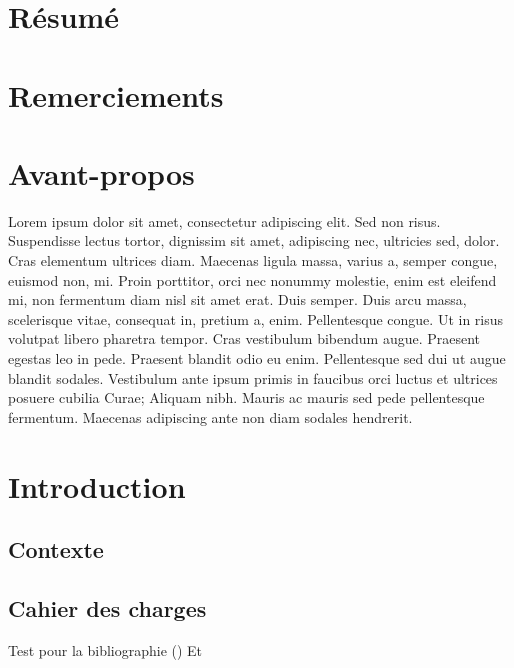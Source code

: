\documentclass[twoside]{report}
\newcommand{\clearemptydoublepage}{\newpage{\pagestyle{empty}
\cleardoublepage}}
\begin{document}
\clearemptydoublepage
\pagestyle{preliminary}
\chapter*{Résumé}
\thispagestyle{empty}
\cleardoublepage
\chapter*{Remerciements}
\thispagestyle{empty}
\cleardoublepage
\chapter*{Avant-propos}
\thispagestyle{empty}
Lorem ipsum dolor sit amet, consectetur adipiscing elit. Sed non risus. Suspendisse lectus tortor, dignissim sit amet, adipiscing nec, ultricies sed, dolor. Cras elementum ultrices diam. Maecenas ligula massa, varius a, semper congue, euismod non, mi. Proin porttitor, orci nec nonummy molestie, enim est eleifend mi, non fermentum diam nisl sit amet erat. Duis semper. Duis arcu massa, scelerisque vitae, consequat in, pretium a, enim. Pellentesque congue. Ut in risus volutpat libero pharetra tempor. Cras vestibulum bibendum augue. Praesent egestas leo in pede. Praesent blandit odio eu enim. Pellentesque sed dui ut augue blandit sodales. Vestibulum ante ipsum primis in faucibus orci luctus et ultrices posuere cubilia Curae; Aliquam nibh. Mauris ac mauris sed pede pellentesque fermentum. Maecenas adipiscing ante non diam sodales hendrerit.

\clearemptydoublepage
\pagestyle{tablecontent}
\tableofcontents{}

\clearemptydoublepage
\pagestyle{fancy}
\chapter*{Introduction}

\section*{Contexte}
\section*{Cahier des charges}

Test pour la bibliographie (\cite{force2017using})
Et \cite{zangenehnejad2021gnss}
\end{document}
